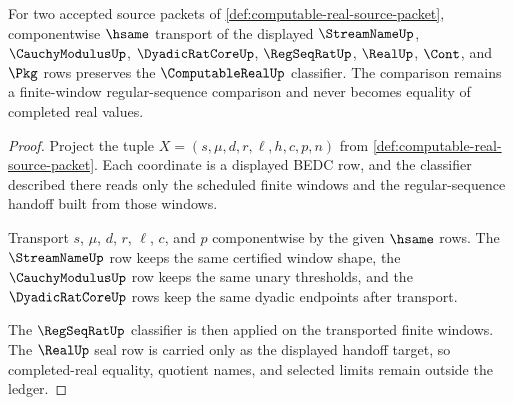 \begin{theorem}
\label{thm:computable-real-classifier-transport}
For two accepted source packets of
\autoref{def:computable-real-source-packet}, componentwise $\hsame$ transport
of the displayed $\StreamNameUp$, $\CauchyModulusUp$, $\DyadicRatCoreUp$,
$\RegSeqRatUp$, $\RealUp$, $\Cont$, and $\Pkg$ rows preserves the
$\ComputableRealUp$ classifier. The comparison remains a finite-window
regular-sequence comparison and never becomes equality of completed real
values.
\end{theorem}
\begin{proof}
Project the tuple
$X=(s,\mu,d,r,\ell,h,c,p,n)$ from
\autoref{def:computable-real-source-packet}. Each coordinate is a displayed
BEDC row, and the classifier described there reads only the scheduled finite
windows and the regular-sequence handoff built from those windows.

Transport $s$, $\mu$, $d$, $r$, $\ell$, $c$, and $p$ componentwise by the
given $\hsame$ rows. The $\StreamNameUp$ row keeps the same certified window
shape, the $\CauchyModulusUp$ row keeps the same unary thresholds, and the
$\DyadicRatCoreUp$ rows keep the same dyadic endpoints after transport.

The $\RegSeqRatUp$ classifier is then applied on the transported finite
windows. The $\RealUp$ seal row is carried only as the displayed handoff
target, so completed-real equality, quotient names, and selected limits remain
outside the ledger.
\end{proof}

